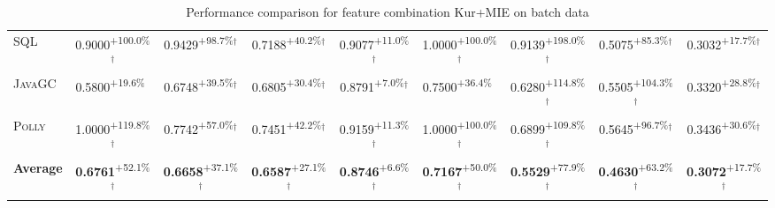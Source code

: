 \begin{table}[htbp]
\begin{tabular}{l|cccc|cccc}
\textsc{SQL} & \cellcolor{green!30}0.9000\textsuperscript{+100.0\%}$^\dagger$ & \cellcolor{green!30}0.9429\textsuperscript{+98.7\%}$^\dagger$ & \cellcolor{green!30}0.7188\textsuperscript{+40.2\%}$^\dagger$ & \cellcolor{green!30}0.9077\textsuperscript{+11.0\%}$^\dagger$ & \cellcolor{green!30}1.0000\textsuperscript{+100.0\%}$^\dagger$ & \cellcolor{green!30}0.9139\textsuperscript{+198.0\%}$^\dagger$ & \cellcolor{green!30}0.5075\textsuperscript{+85.3\%}$^\dagger$ & \cellcolor{green!30}0.3032\textsuperscript{+17.7\%}$^\dagger$ \\
\textsc{JavaGC} & \cellcolor{green!30}0.5800\textsuperscript{+19.6\%}$^{\,\,\,}$ & \cellcolor{green!30}0.6748\textsuperscript{+39.5\%}$^\dagger$ & \cellcolor{green!30}0.6805\textsuperscript{+30.4\%}$^\dagger$ & \cellcolor{green!30}0.8791\textsuperscript{+7.0\%}$^\dagger$ & \cellcolor{green!30}0.7500\textsuperscript{+36.4\%}$^{\,\,\,}$ & \cellcolor{green!30}0.6280\textsuperscript{+114.8\%}$^\dagger$ & \cellcolor{green!30}0.5505\textsuperscript{+104.3\%}$^\dagger$ & \cellcolor{green!30}0.3320\textsuperscript{+28.8\%}$^\dagger$ \\
\textsc{Polly} & \cellcolor{green!30}1.0000\textsuperscript{+119.8\%}$^\dagger$ & \cellcolor{green!30}0.7742\textsuperscript{+57.0\%}$^\dagger$ & \cellcolor{green!30}0.7451\textsuperscript{+42.2\%}$^\dagger$ & \cellcolor{green!30}0.9159\textsuperscript{+11.3\%}$^\dagger$ & \cellcolor{green!30}1.0000\textsuperscript{+100.0\%}$^\dagger$ & \cellcolor{green!30}0.6899\textsuperscript{+109.8\%}$^\dagger$ & \cellcolor{green!30}0.5645\textsuperscript{+96.7\%}$^\dagger$ & \cellcolor{green!30}0.3436\textsuperscript{+30.6\%}$^\dagger$ \\
\hline
\textbf{Average} & \cellcolor{green!30}\textbf{0.6761}\textsuperscript{+52.1\%}$^\dagger$ & \cellcolor{green!30}\textbf{0.6658}\textsuperscript{+37.1\%}$^\dagger$ & \cellcolor{green!30}\textbf{0.6587}\textsuperscript{+27.1\%}$^\dagger$ & \cellcolor{green!30}\textbf{0.8746}\textsuperscript{+6.6\%}$^\dagger$ & \cellcolor{green!30}\textbf{0.7167}\textsuperscript{+50.0\%}$^\dagger$ & \cellcolor{green!30}\textbf{0.5529}\textsuperscript{+77.9\%}$^\dagger$ & \cellcolor{green!30}\textbf{0.4630}\textsuperscript{+63.2\%}$^\dagger$ & \cellcolor{green!30}\textbf{0.3072}\textsuperscript{+17.7\%}$^\dagger$ \\
\hline
\end{tabular}
\caption{Performance comparison for feature combination Kur+MIE on batch data}
\label{tab:combo_Kur_MIE_performance_batch}
\end{table}